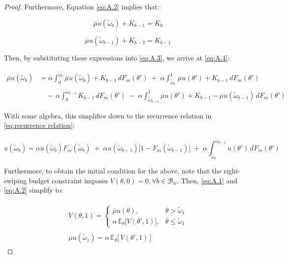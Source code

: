 \begin{proof}
Furthermore, Equation \ref{eq:A.2} implies that:

$$
\overline\mu u(\widetilde\omega_b) +K_{b-1}= K_b
$$

$$
\overline\mu u(\widetilde\omega_{b-1}) +K_{b-2}=K_{b-1}
$$

Then, by substituting these expressions into \ref{eq:A.3}, we arrive at \ref{eq:A.4}:

\begin{equation}\label{eq:A.4}
    \begin{split}
        \overline\mu u(\widetilde\omega_b) &=\alpha \int^{\widetilde\omega_b}_0 \overline\mu u(\widetilde\omega_b) +K_{b-1}\,dF_m(\theta') \;+\; \alpha \int^1_{\widetilde\omega_b} \,\overline\mu u(\theta') + K_{b-1}\,dF_m(\theta')\\ 
                                           & \quad -\,\alpha \int^{\widetilde\omega_{b-1}}_0 K_{b-1}\,dF_m(\theta') \;-\; \alpha \int^1_{\widetilde\omega_{b-1}} \overline\mu u(\theta') + K_{b-1}-\overline\mu u(\widetilde\omega_{b-1})\,dF_m(\theta')
    \end{split}
\end{equation}

With some algebra, this simplifies down to the recurrence relation in \autoref{eq:recurrence relation}: 

\begin{equation}
    u(\widetilde\omega_b)=\alpha   u(\widetilde\omega_b)F_m(\widetilde\omega_b) \;+\; \alpha  u(\widetilde\omega_{b-1})\Big[1  - F_m(\widetilde\omega_{b-1})\Big] \;+\; \alpha\int^{\widetilde\omega_{b-1}}_{\widetilde\omega_b} u(\theta') \,dF_m(\theta') 
\end{equation}

Furthermore, to obtain the initial condition for the above, note that the right-swiping budget constraint imposes $V(\theta,0)=0, \forall b\in \mathcal{B}_w$. Then, \ref{eq:A.1} and \ref{eq:A.2} simplify to:


\begin{align}
    \begin{split}\label{eq:A.5} 
        V(\theta, 1)=\begin{cases} 
            \overline\mu u(\theta),& \theta> \widetilde \omega_1 \\[6pt] 
            \alpha \,\mathbb{E}_{\theta}\Big[V(\theta', 1)\Big],& \theta\leq\widetilde \omega_1
        \end{cases}
    \end{split}\\[10pt]
    \begin{split}\label{eq:A.6}
        \overline\mu u(\widetilde\omega_1) = \alpha \, \mathbb{E}_\theta\Big[\,V(\theta',1)\,\Big] 
    \end{split} 
\end{align}


\end{proof}
